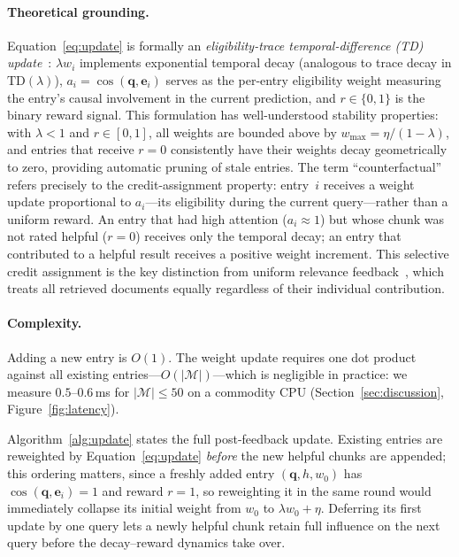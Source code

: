 \documentclass[preprint,12pt]{elsarticle}
\begin{document}
\paragraph{Theoretical grounding.}
Equation~\ref{eq:update} is formally an \emph{eligibility-trace
temporal-difference (TD) update}~\citep{suttonbarto2018rl}: $\lambda w_i$
implements exponential temporal decay (analogous to trace decay in
$\text{TD}(\lambda)$), $a_i = \cos(\mathbf{q},\mathbf{e}_i)$ serves as the
per-entry eligibility weight measuring the entry's causal involvement in the
current prediction, and $r\in\{0,1\}$ is the binary reward signal.  This
formulation has well-understood stability properties: with $\lambda<1$ and
$r\in[0,1]$, all weights are bounded above by $w_{\max} = \eta/(1{-}\lambda)$,
and entries that receive $r=0$ consistently have their weights decay
geometrically to zero, providing automatic pruning of stale entries.  The term
``counterfactual'' refers precisely to the credit-assignment property: entry~$i$
receives a weight update proportional to $a_i$---its eligibility during the
current query---rather than a uniform reward.  An entry that had high attention
($a_i \approx 1$) but whose chunk was not rated helpful ($r=0$) receives only
the temporal decay; an entry that contributed to a helpful result receives a
positive weight increment.  This selective credit assignment is the key
distinction from uniform relevance feedback~\citep{rocchio1971relevance}, which
treats all retrieved documents equally regardless of their individual
contribution.

\paragraph{Complexity.}
Adding a new entry is $O(1)$.  The weight update requires one dot product
against all existing entries---$O(|\mathcal{M}|)$---which is negligible in
practice: we measure $0.5$--$0.6$\,ms for $|\mathcal{M}|\leq 50$ on a commodity
CPU (Section~\ref{sec:discussion}, Figure~\ref{fig:latency}).

Algorithm~\ref{alg:update} states the full post-feedback update.  Existing
entries are reweighted by Equation~\ref{eq:update} \emph{before} the new
helpful chunks are appended; this ordering matters, since a freshly added entry
$(\mathbf{q}, h, w_0)$ has $\cos(\mathbf{q},\mathbf{e}_i)=1$ and reward $r=1$,
so reweighting it in the same round would immediately collapse its initial
weight from $w_0$ to $\lambda w_0 + \eta$.  Deferring its first update by one
query lets a newly helpful chunk retain full influence on the next query before
the decay--reward dynamics take over.
\end{document}
